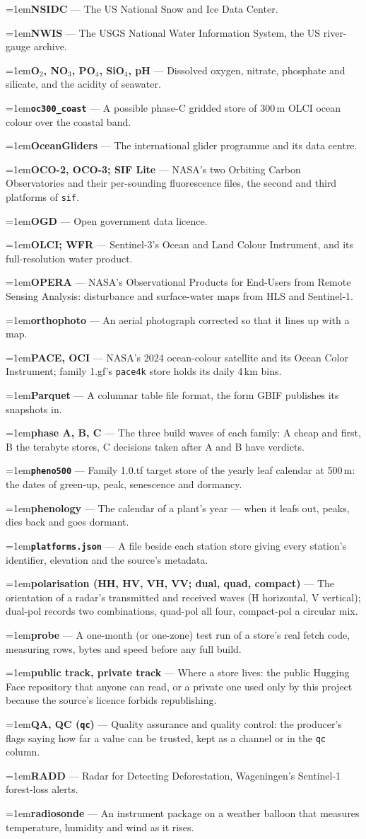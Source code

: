 \documentclass[10pt]{article}
\newcommand{\code}[1]{\texttt{#1}}
\newcommand{\gl}[2]{\par\hangindent=1em\hangafter=1\textbf{#1} --- #2\par}
\begin{document}
\gl{NSIDC}{The US National Snow and Ice Data Center.}
\gl{NWIS}{The USGS National Water Information System, the US river-gauge archive.}
\gl{O$_2$, NO$_3$, PO$_4$, SiO$_4$, pH}{Dissolved oxygen, nitrate, phosphate and silicate, and the acidity of seawater.}
\gl{\code{oc300\_coast}}{A possible phase-C gridded store of 300\,m OLCI ocean colour over the coastal band.}
\gl{OceanGliders}{The international glider programme and its data centre.}
\gl{OCO-2, OCO-3; SIF Lite}{NASA's two Orbiting Carbon Observatories and their per-sounding fluorescence files, the second and third platforms of \code{sif}.}
\gl{OGD}{Open government data licence.}
\gl{OLCI; WFR}{Sentinel-3's Ocean and Land Colour Instrument, and its full-resolution water product.}
\gl{OPERA}{NASA's Observational Products for End-Users from Remote Sensing Analysis: disturbance and surface-water maps from HLS and Sentinel-1.}
\gl{orthophoto}{An aerial photograph corrected so that it lines up with a map.}
\gl{PACE, OCI}{NASA's 2024 ocean-colour satellite and its Ocean Color Instrument; family 1.gf's \code{pace4k} store holds its daily 4\,km bins.}
\gl{Parquet}{A columnar table file format, the form GBIF publishes its snapshots in.}
\gl{phase A, B, C}{The three build waves of each family: A cheap and first, B the terabyte stores, C decisions taken after A and B have verdicts.}
\gl{\code{pheno500}}{Family 1.0.tf target store of the yearly leaf calendar at 500\,m: the dates of green-up, peak, senescence and dormancy.}
\gl{phenology}{The calendar of a plant's year --- when it leafs out, peaks, dies back and goes dormant.}
\gl{\code{platforms.json}}{A file beside each station store giving every station's identifier, elevation and the source's metadata.}
\gl{polarisation (HH, HV, VH, VV; dual, quad, compact)}{The orientation of a radar's transmitted and received waves (H horizontal, V vertical); dual-pol records two combinations, quad-pol all four, compact-pol a circular mix.}
\gl{probe}{A one-month (or one-zone) test run of a store's real fetch code, measuring rows, bytes and speed before any full build.}
\gl{public track, private track}{Where a store lives: the public Hugging Face repository that anyone can read, or a private one used only by this project because the source's licence forbids republishing.}
\gl{QA, QC (\code{qc})}{Quality assurance and quality control: the producer's flags saying how far a value can be trusted, kept as a channel or in the \code{qc} column.}
\gl{RADD}{Radar for Detecting Deforestation, Wageningen's Sentinel-1 forest-loss alerts.}
\gl{radiosonde}{An instrument package on a weather balloon that measures temperature, humidity and wind as it rises.}
\end{document}

